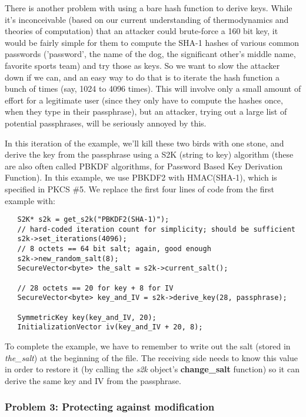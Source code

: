 \documentclass{article}
\newcommand{\function}[1]{\textbf{#1}}
\newcommand{\variable}[1]{\textsl{#1}}
\begin{document}
There is another problem with using a bare hash function to derive
keys. While it's inconceivable (based on our current understanding of
thermodynamics and theories of computation) that an attacker could
brute-force a 160 bit key, it would be fairly simple for them to
compute the SHA-1 hashes of various common passwords ('password', the
name of the dog, the significant other's middle name, favorite sports
team) and try those as keys. So we want to slow the attacker down if
we can, and an easy way to do that is to iterate the hash function a
bunch of times (say, 1024 to 4096 times). This will involve only a
small amount of effort for a legitimate user (since they only have to
compute the hashes once, when they type in their passphrase), but an
attacker, trying out a large list of potential passphrases, will be
seriously annoyed by this.

In this iteration of the example, we'll kill these two birds with one stone,
and derive the key from the passphrase using a S2K (string to key) algorithm
(these are also often called PBKDF algorithms, for Password Based Key
Derivation Function). In this example, we use PBKDF2 with HMAC(SHA-1), which is
specified in PKCS \#5. We replace the first four lines of code from the first
example with:

\begin{verbatim}
   S2K* s2k = get_s2k("PBKDF2(SHA-1)");
   // hard-coded iteration count for simplicity; should be sufficient
   s2k->set_iterations(4096);
   // 8 octets == 64 bit salt; again, good enough
   s2k->new_random_salt(8);
   SecureVector<byte> the_salt = s2k->current_salt();

   // 28 octets == 20 for key + 8 for IV
   SecureVector<byte> key_and_IV = s2k->derive_key(28, passphrase);

   SymmetricKey key(key_and_IV, 20);
   InitializationVector iv(key_and_IV + 20, 8);
\end{verbatim}

To complete the example, we have to remember to write out the salt (stored in
\variable{the\_salt}) at the beginning of the file. The receiving side needs to
know this value in order to restore it (by calling the \variable{s2k} object's
\function{change\_salt} function) so it can derive the same key and IV from the
passphrase.

\subsubsection{Problem 3: Protecting against modification}
\end{document}
